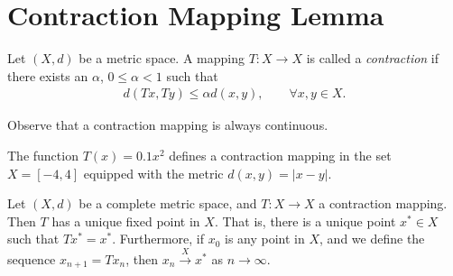 \section{Contraction Mapping Lemma}
\begin{definition}
  Let $\left( X, d \right)$ be a metric space. A mapping $T: X \to X$ is called a
\emph{contraction} if there exists an $\alpha$, $0 \le \alpha <1$ such that
%
%
\begin{equation*}
	\begin{split}
		d(Tx, Ty) \le \alpha d(x,y), \qquad \forall x, y \in X.
	\end{split}
\end{equation*}
%
\end{definition}
%
\begin{framed}
\begin{remark}
	Observe that a contraction mapping is always continuous.
\end{remark}
\end{framed}
%
%
\begin{framed}
\begin{example}
	The function $T(x) = 0.1x^2$ defines a contraction mapping in the set 
	$X = [-4, 4]$ equipped with the metric $d(x,y) = |x-y|$. 
\end{example}
\end{framed}
	\begin{lemma}
		\label{lem:fixed-point}
	Let $(X,d)$ be a complete metric space, and $T: X \to X$ a contraction
	mapping. Then $T$ has a unique fixed point in $X$. That is, there is a unique
	point $x^* \in X$ such that $Tx^* = x^*$. Furthermore, if $x_0$ is any point
  in $X$, and we define the sequence $x_{n+1} = Tx_n$, then $x_n \xrightarrow{X} x^*$ as $n
	\to \infty$.
	\end{lemma}
